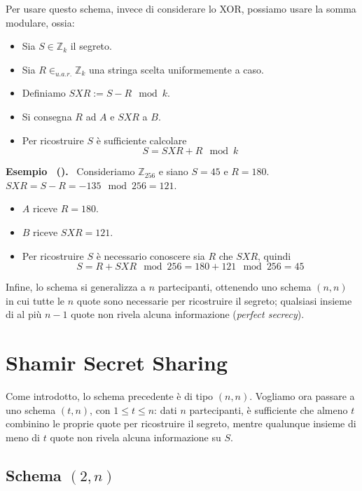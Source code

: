 \documentclass[a4paper, 11pt]{article}
\newenvironment{example}[1][]{
  \par\noindent\textbf{Esempio%
  \if\relax\detokenize{#1}\relax\else\ (\textbf{#1})\fi.}\ }{}
\begin{document}
Per usare questo schema, invece di considerare lo XOR, possiamo usare la somma modulare, ossia:

\begin{itemize}
    \item Sia $S \in \mathbb{Z}_k$ il segreto.
    \item Sia $R \in_{u.a.r.} \mathbb{Z}_k$ una stringa scelta uniformemente a caso.
    \item Definiamo $SXR := S - R \mod k$.
    \item Si consegna $R$ ad $A$ e $SXR$ a $B$.
    \item Per ricostruire $S$ è sufficiente calcolare
    \[
    S = SXR + R \mod k
    \]
\end{itemize}

\begin{example}
    Consideriamo $\mathbb{Z}_{256}$ e siano $S = 45$ e $R = 180$. $SXR = S - R = -135 \mod 256 = 121$.
    \begin{itemize}
        \item $A$ riceve $R = 180$.
        \item $B$ riceve $SXR = 121$.
        \item Per ricostruire $S$ è necessario conoscere sia $R$ che $SXR$, quindi 
        \[S = R + SXR \mod 256 = 180 + 121 \mod 256 = 45\]
    \end{itemize}    
\end{example}

Infine, lo schema si generalizza a $n$ partecipanti, ottenendo uno schema $(n,n)$ in cui tutte le $n$ quote sono necessarie per ricostruire il segreto; qualsiasi insieme di al più $n-1$ quote non rivela alcuna informazione (\textit{perfect secrecy}).

\newpage
\section{Shamir Secret Sharing}

Come introdotto, lo schema precedente è di tipo $(n,n)$. Vogliamo ora passare a uno schema $(t,n)$, con $1 \le t \le n$: dati $n$ partecipanti, è sufficiente che almeno $t$ combinino le proprie quote per ricostruire il segreto, mentre qualunque insieme di meno di $t$ quote non rivela alcuna informazione su $S$.

\subsection{Schema $(2, n)$}
\end{document}

